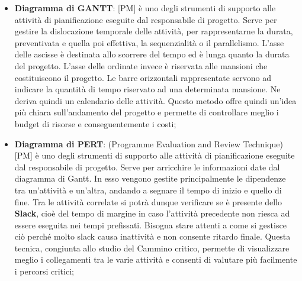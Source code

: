 \begin{itemize}
	\item \textbf {Diagramma di GANTT}: [PM] è uno degli strumenti di supporto alle attività di pianificazione eseguite dal responsabile di progetto. \newline
Serve per gestire la dislocazione temporale delle attività, per rappresentarne la durata, preventivata e quella poi effettiva, la sequenzialità o il parallelismo. \newline
L'asse delle ascisse è destinata allo scorrere del tempo ed è lunga quanto la durata del progetto. \newline
L'asse delle ordinate invece è riservata alle mansioni che costituiscono il progetto. \newline
Le barre orizzontali rappresentate servono ad indicare la quantità di tempo riservato ad una determinata mansione. Ne deriva quindi un calendario delle attività. \newline
Questo metodo offre quindi un'idea più chiara sull'andamento del progetto e permette di controllare meglio i budget di risorse e conseguentemente i costi;

	\item \textbf {Diagramma di PERT}: (Programme Evaluation and Review Technique) [PM] è uno degli strumenti di supporto alle attività di pianificazione eseguite dal responsabile di progetto. \newline
Serve per arricchire le informazioni date dal diagramma di Gantt. In esso vengono gestite principalmente le dipendenze tra un'attività e un'altra, andando a segnare il tempo di inizio e quello di fine. Tra le attività correlate si potrà dunque verificare se è presente dello \textbf{Slack}, cioè del tempo di margine in caso l'attività precedente non riesca ad essere eseguita nei tempi prefissati. Bisogna stare attenti a come si gestisce ciò perché molto slack causa inattività e non consente ritardo finale.   \newline
Questa tecnica, congiunta allo studio del Cammino critico, permette di visualizzare meglio i collegamenti tra le varie attività e consenti di valutare più facilmente i percorsi critici;


\end{itemize}
